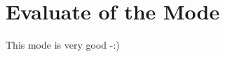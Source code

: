 \documentclass[../mcmpaper]{subfiles}
\begin{document}
	\section{Evaluate of the Mode}
	This mode is very good -:)
\end{document}
